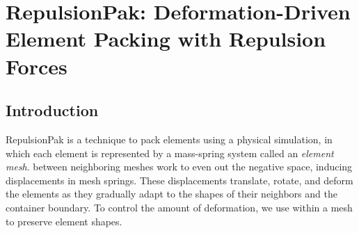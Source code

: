 
\newcommand{\simforce}[1]{\bm{F}_\mathrm{#1}}

\chapter[RepulsionPak: Deformation-Driven Element Packing \newline with Repulsion Forces]
{RepulsionPak: Deformation-Driven Element Packing with Repulsion Forces}
\label{chapter_repulsionpak}


\section{Introduction}
\label{repulsionpak_introduction}


\newtext
{
RepulsionPak is a technique
to pack elements using a physical simulation, 
in which each element is represented
by a mass-spring system called an \textit{element mesh}.  
 between neighboring meshes work to even out the negative
space, inducing displacements in mesh springs.
These displacements translate, rotate, and deform the elements as 
they gradually adapt to the shapes of their neighbors
and the container boundary.  
To control the amount of deformation,
we use  within a mesh to preserve element shapes.}


